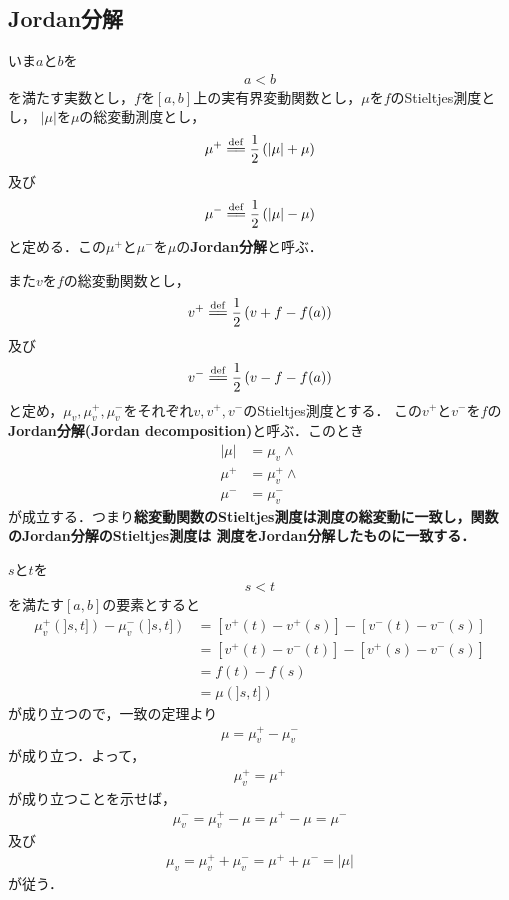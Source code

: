 \subsection{Jordan分解}
	いま$a$と$b$を
	\begin{align}
		a < b
	\end{align}
	を満たす実数とし，$f$を$[a,b]$上の実有界変動関数とし，$\mu$を$f$のStieltjes測度とし，
	$|\mu|$を$\mu$の総変動測度とし，
	\begin{align}
		\mu^{+} \defeq \frac{1}{2}\left(|\mu| + \mu\right)
	\end{align}
	及び
	\begin{align}
		\mu^{-} \defeq \frac{1}{2}\left(|\mu| - \mu\right)
	\end{align}
	と定める．この$\mu^{+}$と$\mu^{-}$を$\mu$の{\bf Jordan分解}と呼ぶ．
	
	また$v$を$f$の総変動関数とし，
	\begin{align}
		v^{+} \defeq \frac{1}{2}\left(v + f - f(a)\right)
	\end{align}
	及び
	\begin{align}
		v^{-} \defeq \frac{1}{2}\left(v - f - f(a)\right)
	\end{align}
	と定め，$\mu_{v},\mu_{v}^{+},\mu_{v}^{-}$をそれぞれ$v,v^{+},v^{-}$のStieltjes測度とする．
	この$v^{+}$と$v^{-}$を$f$の{\bf Jordan分解}{\bf (Jordan decomposition)}と呼ぶ．このとき
	\begin{align}
		|\mu| &= \mu_{v} \wedge \\
		\mu^{+} &= \mu_{v}^{+} \wedge \\
		\mu^{-} &= \mu_{v}^{-}
		\label{fom:Jordan_decompositions_of_measure_and_function_coincide}
	\end{align}
	が成立する．つまり{\bf 総変動関数のStieltjes測度は測度の総変動に一致し，関数のJordan分解のStieltjes測度は
	測度をJordan分解したものに一致する．}
	
	$s$と$t$を
	\begin{align}
		s < t
	\end{align}
	を満たす$[a,b]$の要素とすると
	\begin{align}
		\mu_{v}^{+}(]s,t]) - \mu_{v}^{-}(]s,t])
		&= [v^{+}(t) - v^{+}(s)] - [v^{-}(t) - v^{-}(s)] \\
		&= [v^{+}(t) - v^{-}(t)] - [v^{+}(s) - v^{-}(s)] \\
		&= f(t) - f(s) \\
		&= \mu(]s,t])
	\end{align}
	が成り立つので，一致の定理より
	\begin{align}
		\mu = \mu_{v}^{+} - \mu_{v}^{-}
	\end{align}
	が成り立つ．よって，
	\begin{align}
		\mu_{v}^{+} = \mu^{+}
	\end{align}
	が成り立つことを示せば，
	\begin{align}
		\mu_{v}^{-} = \mu_{v}^{+} - \mu = \mu^{+} - \mu = \mu^{-}
	\end{align}
	及び
	\begin{align}
		\mu_{v} = \mu_{v}^{+} + \mu_{v}^{-} = \mu^{+} + \mu^{-} = |\mu|
	\end{align}
	が従う．
	
